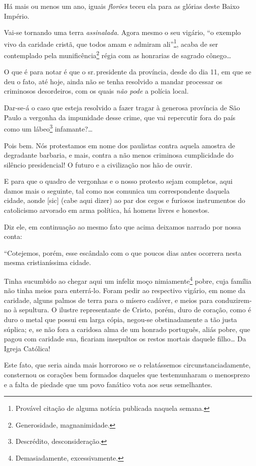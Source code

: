 Há mais ou menos um ano, iguais \emph{florões} teceu ela para as glórias
deste Baixo Império.

Vai-se tornando uma terra \emph{assinalada}. Agora mesmo o seu vigário,
``o exemplo vivo da caridade cristã, que todos amam e admiram
ali''\footnote{Provável citação de alguma notícia publicada naquela
  semana.}, acaba de ser contemplado pela munificência\footnote{
  Generosidade, magnanimidade.} régia com as honrarias de sagrado
cônego\ldots{}

O que é para notar é que o sr.\,presidente da província, desde do dia 11,
em que se deu o fato, até hoje, ainda não se tenha resolvido a mandar
processar os criminosos desordeiros, com os quais \emph{não pode} a
polícia local.

Dar-se-á o caso que esteja resolvido a fazer tragar à generosa província
de São Paulo a vergonha da impunidade desse crime, que vai repercutir
fora do país como um lábeo\footnote{Descrédito, desconsideração.}
infamante?\ldots{}

Pois bem. Nós protestamos em nome dos paulistas contra aquela amostra de
degradante barbaria, e mais, contra a não menos criminosa cumplicidade
do silêncio presidencial! O futuro e a civilização nos hão de ouvir.

E para que o quadro de vergonhas e o nosso protesto sejam completos,
aqui damos mais o seguinte, tal como nos comunica um correspondente
daquela cidade, aonde {[}sic{]} (cabe aqui dizer) ao par dos cegos e
furiosos instrumentos do catolicismo arvorado em arma política, há
homens livres e honestos.

Diz ele, em continuação ao mesmo fato que acima deixamos narrado por
nossa conta:

``Cotejemos, porém, esse escândalo com o que poucos dias antes ocorrera
nesta mesma cristianíssima cidade.

Tinha sucumbido ao chegar aqui um infeliz moço nimiamente\footnote{Demasiadamente,
  excessivamente.} pobre, cuja família não tinha meios para enterrá-lo.
Foram pedir ao respectivo vigário, em nome da caridade, alguns palmos de
terra para o mísero cadáver, e meios para conduzirem-no à sepultura. O
ilustre representante de Cristo, porém, duro de coração, como é duro o
metal que possui em larga cópia, negou-se obstinadamente a tão justa
súplica; e, se não fora a caridosa alma de um honrado português, aliás
pobre, que pagou com caridade sua, ficariam insepultos os restos mortais
daquele filho\ldots{} Da Igreja Católica!

Este fato, que seria ainda mais horroroso se o relatássemos
circunstanciadamente, consternou os corações bem formados daqueles que
testemunharam o menosprezo e a falta de piedade que um povo fanático
vota aos seus semelhantes.

